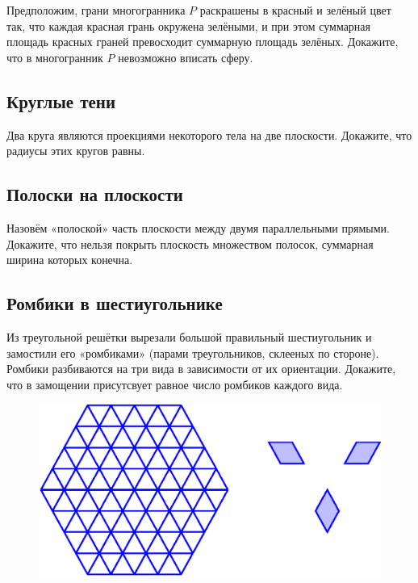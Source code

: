 Предположим, грани многогранника $P$ раскрашены в красный и зелёный цвет так, что каждая красная грань окружена зелёными, и при этом суммарная площадь красных граней превосходит суммарную площадь зелёных.
Докажите, что в многогранник $P$ невозможно вписать сферу.

\subsection*{Круглые тени}%

Два круга являются проекциями некоторого тела на две плоскости.
Докажите, что радиусы этих кругов равны.

\subsection*{Полоски на плоскости}%

Назовём «полоской» часть плоскости между двумя параллельными прямыми.
Докажите, что нельзя покрыть плоскость множеством полосок, суммарная ширина которых конечна.

\subsection*{Ромбики в шестиугольнике}%

Из треугольной решётки вырезали большой правильный шестиугольник и замостили его «ромбиками» (парами  треугольников, склееных по стороне).
Ромбики разбиваются на три вида в зависимости от их ориентации.
Докажите, что в замощении присутсвует равное число ромбиков каждого вида.

\begin{figure}[h!]
\centering
\includegraphics[scale=0.55]{Figs/Geometry/hex}
\end{figure}

